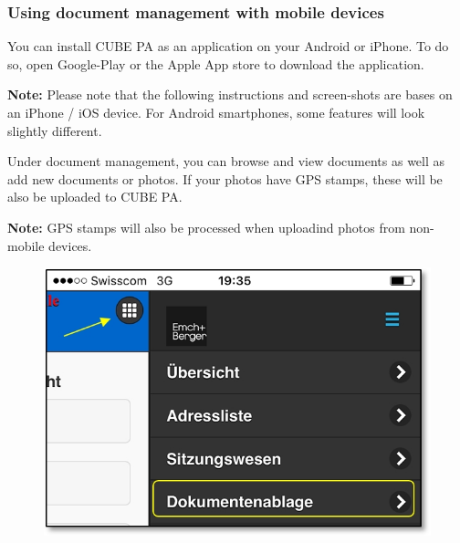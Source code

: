 \vspace{\baselineskip}
\vspace{\baselineskip}
\vspace{\baselineskip}
\vspace{\baselineskip}

\subsubsection{Using document management with mobile devices}

You can install CUBE PA as an application on your Android or iPhone. To do so, open Google-Play or the Apple App store to download the application.

\vspace{\baselineskip}

\textbf{Note:} Please note that the following instructions and screen-shots are bases on an iPhone / iOS device. For Android smartphones, some features will look slightly different.

\vspace{\baselineskip}

Under document management, you can browse and view documents as well as add new documents or photos. If your photos have GPS stamps, these will be also be uploaded to CUBE PA.

\vspace{\baselineskip}

\textbf{Note:} GPS stamps will also be processed when uploadind photos from non-mobile devices.

\vspace{\baselineskip}

\begin{figure}   %
  \vspace{-35pt}      %
  \begin{center}
    \includegraphics[width=1\linewidth]{../chapters/11_Dokumentenablage/pictures/11-mob01_Dokumentenablage_oeffnen.jpg}
  \end{center}
  \vspace{-20pt}
  \vspace{-10pt}
\end{figure}

